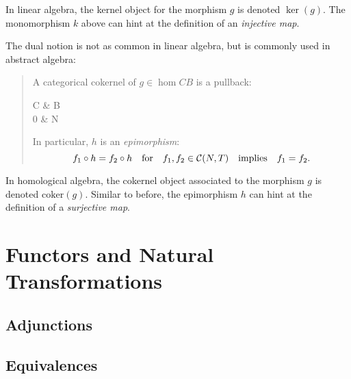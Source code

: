 \documentclass[11pt]{article}
\theoremstyle{definition}
\begin{document}
In linear algebra, the kernel object for the morphism $g$ is denoted $\ker(g)$. The monomorphism $k$ above can hint at the definition of an \textit{injective map}.

The dual notion is not as common in linear algebra, but is commonly used in abstract algebra:

\begin{quotation}
  A categorical cokernel of $g\in\hom{C}{B}$ is a pullback:
  \vspace{-0.1in}
  \begin{cd}
    C \ar[r, "g"] \ar[d] \& B \ar[d, "h"] \\
    0 \ar[r]             \& N
  \end{cd}
  In particular, $h$ is an \textit{epimorphism}:
  \[ f_1\circ h=f_2\circ h \quad \text{for} \quad f_1,f_2\in\mathcal{C}(N,T) \quad \text{implies} \quad f_1=f_2. \]
\end{quotation}

In homological algebra, the cokernel object associated to the morphism $g$ is denoted $\mathrm{coker}(g)$.
Similar to before, the epimorphism $h$ can hint at the definition of a \textit{surjective map}.

\section{Functors and Natural Transformations}

\subsection{Adjunctions}

\subsection{Equivalences}






\nocite{ctc-as:book}
\printbibliography
\end{document}
